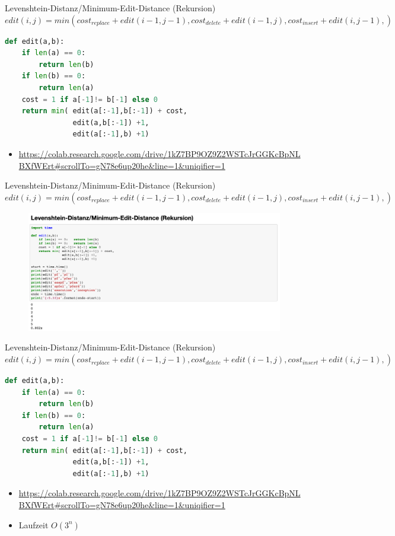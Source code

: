 \documentclass[aspectratio=169]{beamer}
\begin{document}
\begin{frame}[fragile]{Levenshtein-Distanz/Minimum-Edit-Distance (Rekursion)}
$edit(i,j)=min(cost_{replace} + edit(i-1,j-1),cost_{delete}+ edit(i-1,j), cost_{insert}+ edit(i,j-1), )$
\begin{lstlisting}[language=Python]
def edit(a,b):
    if len(a) == 0:
        return len(b)
    if len(b) == 0:
        return len(a)
    cost = 1 if a[-1]!= b[-1] else 0
    return min( edit(a[:-1],b[:-1]) + cost,
                edit(a,b[:-1]) +1,
                edit(a[:-1],b) +1)
\end{lstlisting}
\pause
 \begin{itemize}
     \item \url{https://colab.research.google.com/drive/1kZ7BP9OZ9Z2WSTcJrGGKcBpNLBXfWErt#scrollTo=gN78e6up20he&line=1&uniqifier=1}
 \end{itemize}
\end{frame}

\begin{frame}[fragile]{Levenshtein-Distanz/Minimum-Edit-Distance (Rekursion)}
$edit(i,j)=min(cost_{replace} + edit(i-1,j-1),cost_{delete}+ edit(i-1,j), cost_{insert}+ edit(i,j-1), )$
\begin{figure}
    \centering
    \includegraphics[width=0.9\linewidth]{code_recursion.png}
\end{figure}
\end{frame}

\begin{frame}[fragile]{Levenshtein-Distanz/Minimum-Edit-Distance (Rekursion)}
$edit(i,j)=min(cost_{replace} + edit(i-1,j-1),cost_{delete}+ edit(i-1,j), cost_{insert}+ edit(i,j-1), )$
\begin{lstlisting}[language=Python]
def edit(a,b):
    if len(a) == 0:
        return len(b)
    if len(b) == 0:
        return len(a)
    cost = 1 if a[-1]!= b[-1] else 0
    return min( edit(a[:-1],b[:-1]) + cost,
                edit(a,b[:-1]) +1,
                edit(a[:-1],b) +1)
\end{lstlisting}
 \begin{itemize}
     \item \url{https://colab.research.google.com/drive/1kZ7BP9OZ9Z2WSTcJrGGKcBpNLBXfWErt#scrollTo=gN78e6up20he&line=1&uniqifier=1}
     \item Laufzeit  $O(3^{n})$
 \end{itemize}
\end{frame}
\end{document}
